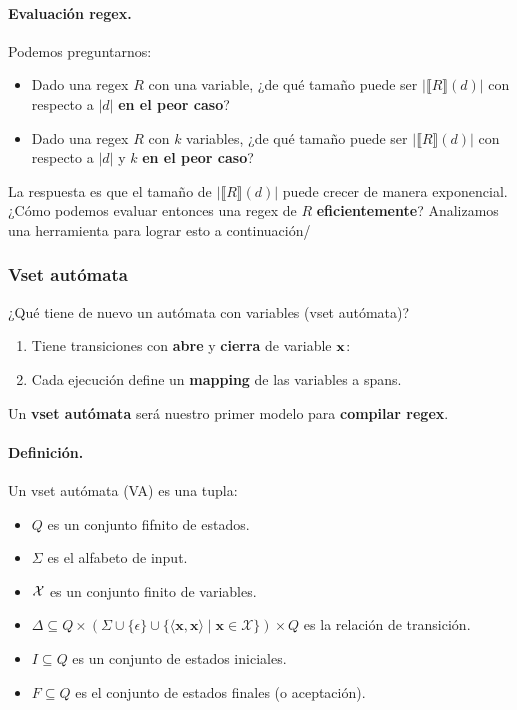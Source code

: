 \paragraph{Evaluación regex.} Podemos preguntarnos:

\begin{itemize}
    \item Dado una regex $R$ con una variable, ¿de qué tamaño puede ser $|\llbracket R \rrbracket(d)|$ con respecto a $|d|$ \textbf{en el peor caso}?
    \item Dado una regex $R$ con $k$ variables, ¿de qué tamaño puede ser $|\llbracket R \rrbracket(d)|$ con respecto a $|d|$ y $k$ \textbf{en el peor caso}?
\end{itemize}

La respuesta es que el tamaño de $|\llbracket R \rrbracket(d)|$ puede crecer de manera exponencial. ¿Cómo podemos evaluar entonces una regex de $R$ \textbf{eficientemente}? Analizamos una herramienta para lograr esto a continuación/

\subsubsection{Vset autómata}

¿Qué tiene de nuevo un autómata con variables (vset autómata)?
\begin{enumerate}
    \item Tiene transiciones con \textbf{abre} y \textbf{cierra} de variable $\mathbf{x}$:
    \item Cada ejecución define un \textbf{mapping} de las variables a spans.
\end{enumerate}
Un \textbf{vset autómata} será nuestro primer modelo para \textbf{compilar regex}.

\paragraph{Definición.} Un vset autómata (VA) es una tupla:
\begin{itemize}
    \item $Q$ es un conjunto fifnito de estados.
    \item $\Sigma$ es el alfabeto de input.
    \item $\mathcal{X}$ es un conjunto finito de variables.
    \item $\Delta \subseteq Q \times(\Sigma \cup\{\epsilon\} \cup\{\langle\mathbf{x}, \mathbf{x}\rangle \mid \mathbf{x} \in \mathcal{X}\}) \times Q$ es la relación de transición.
    \item $I \subseteq Q$ es un conjunto de estados iniciales.
    \item $F \subseteq Q$ es el conjunto de estados finales (o aceptación).
\end{itemize}

